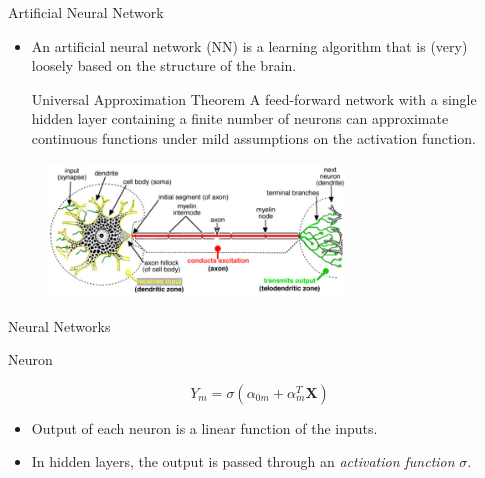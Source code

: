 \documentclass{beamer}
\let \vec \mathbf
\begin{document}
\begin{frame}{Artificial Neural Network}
\begin{itemize}
        \item An artificial neural network (NN) is a learning algorithm that is (very) loosely based on the structure of the brain.
        \begin{block}{Universal Approximation Theorem\cite{csajiApproximationArtificialNeural}}
        A feed-forward network with a single hidden layer containing a finite number of neurons can approximate continuous functions under mild assumptions on the activation function. 
        \end{block}
\end{itemize}
\begin{figure}
        \centering
        \includegraphics[width=0.7\textwidth]{figures/neuron.jpg}
    \end{figure}
\end{frame}


\begin{frame}{Neural Networks}
    
\end{frame}


\begin{frame}{Neuron}
\begin{figure}
\end{figure}
\begin{equation*}
    Y_m = \sigma(\alpha_{0m} + \alpha_{m}^T \vec{X})
\end{equation*}
    \begin{itemize}
        \item Output of each neuron is a linear function of the inputs.
        \item In hidden layers, the output is passed through an \textit{activation function} $\sigma$.
    \end{itemize}
\end{frame}
\end{document}
